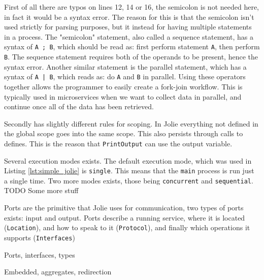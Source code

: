 First of all there are typos on lines 12, 14 or 16, the semicolon is not needed
here, in fact it would be a syntax error. The reason for this is that the
semicolon isn't used strictly for parsing purposes, but it instead for having
multiple statements in a process. The "semicolon" statement, also called a
sequence statement, has a syntax of \verb!A ; B!, which should be read as:
first perform statement \verb!A!, then perform \verb!B!. The sequence
statement requires both of the operands to be present, hence the syntax error.
Another similar statement is the parallel statement, which has a syntax of
\verb!A | B!, which reads as: do \verb!A! and \verb!B! in parallel. Using
these operators together allows the programmer to easily create a fork-join
workflow. This is typically used in microservices when we want to collect
data in parallel, and continue once all of the data has been retrieved.

Secondly has slightly different rules for scoping. In Jolie everything not
defined in the global scope goes into the same scope. This also persists
through calls to defines. This is the reason that \verb!PrintOutput! can use
the output variable.

Several execution modes exists. The default execution mode, which was used in
Listing \ref{lst:simple_jolie} is \verb!single!. This means that the
\verb!main!  process is run just a single time. Two more modes exists, those
being \verb!concurrent! and \verb!sequential!. TODO Some more stuff

Ports are the primitive that Jolie uses for communication, two types of ports
exists: input and output. Ports describe a running service, where it is located
(\verb!Location!), and how to speak to it (\verb!Protocol!), and finally which
operations it supports (\verb!Interfaces!)

Ports, interfaces, types

Embedded, aggregates, redirection
